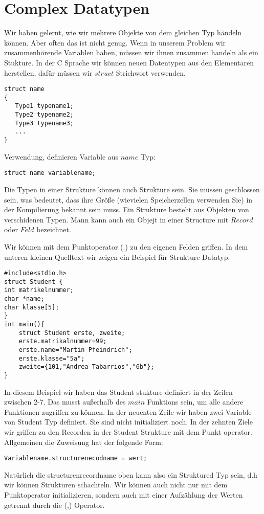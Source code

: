 \documentclass{article}[12pt]
\newenvironment{myalertblock}[1]{%
    \tcolorbox[beamer,%
    noparskip,breakable,
    colback=White,colframe=Bittersweet,%
    colbacklower=Peach!75!White,%
    title=#1]}%
    {\endtcolorbox}
\begin{document}
\section{Complex Datatypen}
Wir haben gelernt, wie wir mehrere Objekte von dem gleichen Typ händeln
können. Aber often das ist nicht genug. Wenn in unserem Problem
wir zusammenhörende Variablen haben, müssen wir ihnen zusammen handeln
als ein Stukture. In der C Sprache wir können neuen Datentypen aus
den Elementaren herstellen, dafür müssen wir $struct$ Strichwort
verwenden.
\begin{myalertblock}{struct Typdefinierung}
\begin{lstlisting}
struct name
{
   Type1 typename1;
   Type2 typename2;
   Type3 typename3;
   ...
}
\end{lstlisting}
\vspace{-0.4cm}
Verwendung, definieren Variable aus $name$ Typ:
\begin{lstlisting}
struct name variablename;
\end{lstlisting}
\vspace{-0.4cm} 
Die Typen in einer Strukture können auch Strukture sein.
Sie müssen geschlossen sein, was bedeutet, dass ihre Größe
(wievielen Speicherzellen verwenden Sie) in der Kompilierung
bekannt sein muss.
\end{myalertblock}
Ein Strukture besteht aus Objekten von verschidenen Typen. 
Mann kann auch ein Objejt in einer Structure mit $Record$ 
oder $Feld$ bezeichnet.

Wir können mit dem Punktoperator (.) zu den eigenen Felden
griffen. In dem unteren kleinen Quelltext wir zeigen ein Beispiel
für Strukture Datatyp.
\begin{lstlisting}
#include<stdio.h>
struct Student { 
int matrikelnummer;
char *name;
char klasse[5];
}
int main(){
    struct Student erste, zweite;
    erste.matrikalnummer=99;
    erste.name="Martin Pfeindrich";
    erste.klasse="5a";
    zweite={101,"Andrea Tabarrios","6b"};
}
\end{lstlisting}
In diesem Beispiel wir haben das Student stukture definiert in der Zeilen zwischen 2-7.
Das musst außerhalb des $main$ Funktions sein, um alle andere Funktionen zugriffen zu können.
In der neuenten Zeile wir haben zwei Variable von Student Typ definiert. Sie sind 
nicht initializiert noch. In der zehnten Ziele wir griffen zu den Recorden in der
Student Strukture mit dem Punkt operator. Allgemeinen die Zuweisung hat der folgende Form:
\begin{lstlisting}
Variablename.structurenecodname = wert;
\end{lstlisting}
Natürlich die structurenrecordname oben kann also ein Struktured Typ sein, d.h wir können
Strukturen schachteln. Wir können auch nicht nur mit dem Punktoperator initializieren, sondern
auch mit einer Aufzählung der Werten getrennt durch die (,) Operator.
\end{document}
